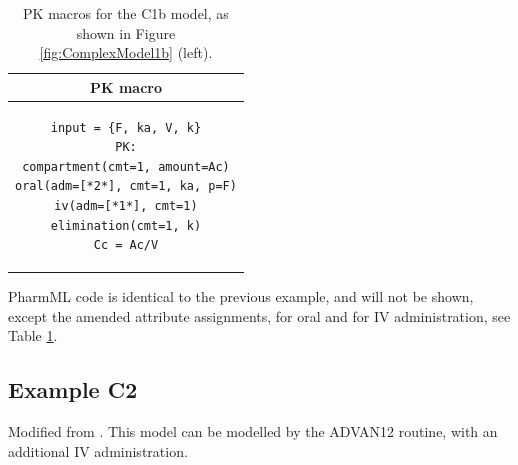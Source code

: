 \begin{table}[h!]
\setlength{\tabcolsep}{15pt}
\begin{center}
\begin{tabular}{c}
  \hline \hline
PK macro  \\[-.25ex]
  \hline
\lstset{language=NONMEMdataSet}
\begin{lstlisting}
input = {F, ka, V, k}
PK:
compartment(cmt=1, amount=Ac)
oral(adm=[*2*], cmt=1, ka, p=F)
iv(adm=[*1*], cmt=1)
elimination(cmt=1, k)
Cc = Ac/V
\end{lstlisting}
\\
  \hline
\end{tabular}
\caption{PK macros  for the C1b model, as shown in Figure \ref{fig:ComplexModel1b} (left).}
\label{tab:C1bMacrosTable}
\end{center}
\end{table}


PharmML code is identical to the previous example, and will not be shown, except the 
amended  attribute assignments,  for oral 
and  for IV administration, see Table \ref{tab:C1bMacrosTable}.
%                


\subsection{Example C2}
Modified from \cite{MLXTRANforMonolix:2014}. This model can be modelled by the 
ADVAN12 routine, with an additional IV administration.

